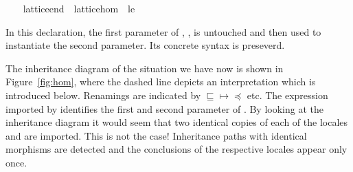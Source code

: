 \begin{isabellebody}
\begin{isamarkuptext}
\end{isamarkuptext}%
\isamarkuptrue%
\ \ \isamarkupfalse%
\ lattice{\isacharunderscore}end\ {\isacharequal}\ lattice{\isacharunderscore}hom\ {\isacharunderscore}\ le%
\begin{isamarkuptext}%
In this declaration, the first parameter of , , is untouched and then used to instantiate
  the second parameter.  Its concrete syntax is preseverd.%
\end{isamarkuptext}%
\isamarkuptrue%
%
\begin{isamarkuptext}%
The inheritance diagram of the situation we have now is shown
  in Figure~\ref{fig:hom}, where the dashed line depicts an
  interpretation which is introduced below.  Renamings are
  indicated by $\sqsubseteq \mapsto \preceq$ etc.  The expression
  imported by  identifies the first and second
  parameter of .  By looking at the inheritance diagram it would seem
  that two identical copies of each of the locales  and  are imported.  This is not the
  case!  Inheritance paths with identical morphisms are detected and
  the conclusions of the respective locales appear only once.


\end{isamarkuptext}
\end{isabellebody}

